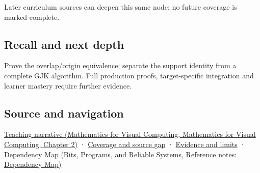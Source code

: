 Later curriculum sources can deepen this same node; no future coverage is marked complete.

\subsection{Recall and next depth}\label{appendix-215ac7099a82-recall-and-next-depth}

Prove the overlap/origin equivalence; separate the support identity from a complete GJK algorithm. Full production proofs, target-specific integration and learner mastery require further evidence.

\subsection{Source and navigation}\label{appendix-215ac7099a82-source-and-navigation}

\href{../02-Mathematics-for-Visual-Computing/main.pdf\#nameddest=01-foundations-i-ch018-weighted-points-lead-from-affine-geometry-to-collision-shapes}{Teaching narrative (Mathematics for Visual Computing, Mathematics for Visual Computing, Chapter 2)} · \hyperref[appendix-fd090d982a15-phase-6---parts-501-600]{Coverage and source gap} · \hyperref[appendix-a103e7846d21-phase-6---source-analysis-and-verification]{Evidence and limits} · \href{../01-Bits-Programs-and-Reliable-Systems/main.pdf\#nameddest=appendix-4ad47bdd269a}{Dependency Map (Bits, Programs, and Reliable Systems, Reference notes: Dependency Map)}
